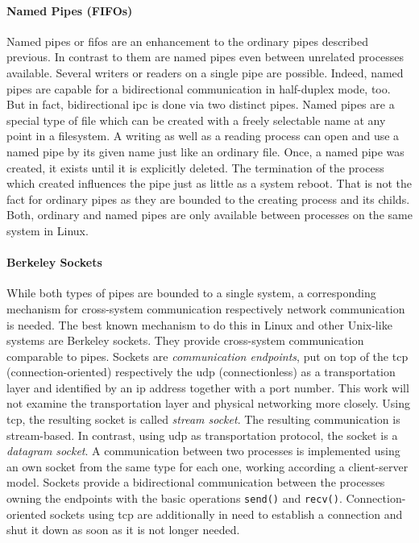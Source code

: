 \paragraph{Named Pipes (FIFOs)}
Named pipes or \acp{fifo} are an enhancement to the ordinary pipes described previous.
In contrast to them are named pipes even between unrelated processes available.
Several writers or readers on a single pipe are possible.
Indeed, named pipes are capable for a bidirectional communication in half-duplex mode, too.
But in fact, bidirectional \ac{ipc} is done via two distinct pipes\cite{silberschatz2009operating}.
Named pipes are a special type of file which can be created with a freely selectable name at any point in a filesystem.
A writing as well as a reading process can open and use a named pipe by its given name just like an ordinary file\cite{glatz2015betriebssysteme}.
Once, a named pipe was created, it exists until it is explicitly deleted. 
The termination of the process which created influences the pipe just as little as a system reboot\cite{silberschatz2009operating}.
That is not the fact for ordinary pipes as they are bounded to the creating process and its childs.
Both, ordinary and named pipes are only available between processes on the same system in Linux\cite{silberschatz2009operating}. 

\paragraph{Berkeley Sockets}
While both types of pipes are bounded to a single system, a corresponding mechanism for cross-system communication respectively network communication is needed.
The best known mechanism to do this in Linux and other Unix-like systems are Berkeley sockets.
They provide cross-system communication comparable to pipes\cite{glatz2015betriebssysteme}.
Sockets are \textit{communication endpoints}, put on top of the \ac{tcp} (connection-oriented) respectively the \ac{udp} (connectionless) as a transportation layer and identified by an \ac{ip} address together with a port number\cite{silberschatz2009operating}.
This work will not examine the transportation layer and physical networking more closely.
Using \ac{tcp}, the resulting socket is called \textit{stream socket}.
The resulting communication is stream-based.
In contrast, using \ac{udp} as transportation protocol, the socket is a \textit{datagram socket}\cite{silberschatz2009operating}.
A communication between two processes is implemented using an own socket from the same type for each one, working according a client-server model.
Sockets provide a bidirectional communication between the processes owning the endpoints with the basic operations \texttt{send()} and \texttt{recv()}.
Connection-oriented sockets using \ac{tcp} are additionally in need to establish a connection and shut it down as soon as it is not longer needed\cite{glatz2015betriebssysteme}.


